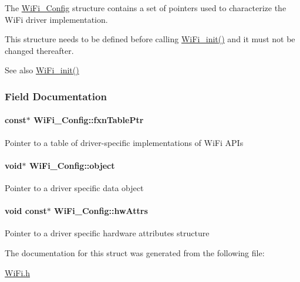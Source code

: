 The \hyperlink{struct_wi_fi___config}{Wi\+Fi\+\_\+\+Config} structure contains a set of pointers used to characterize the Wi\+Fi driver implementation.

This structure needs to be defined before calling \hyperlink{_wi_fi_8h_a306a67ecbf66c31b31ee62a7170c563c}{Wi\+Fi\+\_\+init()} and it must not be changed thereafter.

\begin{DoxySeeAlso}{See also}
\hyperlink{_wi_fi_8h_a306a67ecbf66c31b31ee62a7170c563c}{Wi\+Fi\+\_\+init()} 
\end{DoxySeeAlso}


\subsubsection{Field Documentation}
\paragraph[{fxn\+Table\+Ptr}]{ const$\ast$ Wi\+Fi\+\_\+\+Config\+::fxn\+Table\+Ptr}\label{struct_wi_fi___config_a8cf499e237aab6a403419c8d44bff748}
Pointer to a table of driver-\/specific implementations of Wi\+Fi A\+P\+Is 
\paragraph[{object}]{\setlength{\rightskip}{0pt plus 5cm}void$\ast$ Wi\+Fi\+\_\+\+Config\+::object}\label{struct_wi_fi___config_a8e0dca8ae15856ee64627f5837abb744}
Pointer to a driver specific data object 
\paragraph[{hw\+Attrs}]{\setlength{\rightskip}{0pt plus 5cm}void const$\ast$ Wi\+Fi\+\_\+\+Config\+::hw\+Attrs}\label{struct_wi_fi___config_a376ec48ac5e8e29ff93812758ec085cc}
Pointer to a driver specific hardware attributes structure 

The documentation for this struct was generated from the following file\+:\begin{DoxyCompactItemize}
\item 
\hyperlink{_wi_fi_8h}{Wi\+Fi.\+h}\end{DoxyCompactItemize}
